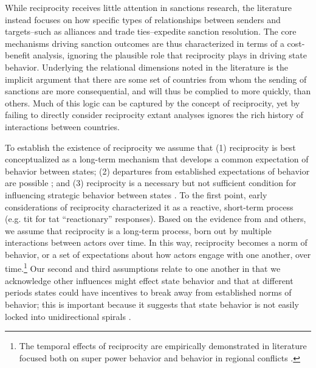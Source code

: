 While reciprocity receives little attention in sanctions research, the literature instead focuses on how specific types of relationships between senders and targets--such as alliances and trade ties--expedite sanction resolution. The core mechanisms driving sanction outcomes are thus characterized in terms of a cost-benefit analysis, ignoring the plausible role that reciprocity plays in driving state behavior. Underlying the relational dimensions noted in the literature is the implicit argument that there are some set of countries from whom the sending of sanctions are more consequential, and will thus be complied to more quickly, than others. Much of this logic can be captured by the concept of reciprocity, yet by failing to directly consider reciprocity extant analyses ignores the rich history of interactions between countries. 

To establish the existence of reciprocity we assume that (1) reciprocity is best conceptualized as a long-term mechanism that develops a common expectation of behavior between states; (2) departures from established expectations of behavior are possible \citep{moore1995}; and (3) reciprocity is a necessary but not sufficient condition for influencing strategic behavior between states \citep{goldstein2001}. To the first point, early considerations of reciprocity characterized it as a reactive, short-term process (e.g. tit for tat ``reactionary'' responses). Based on the evidence from \citet{rajmaira:1990} and others, we assume that reciprocity is a long-term process, born out by multiple interactions between actors over time. In this way, reciprocity becomes a norm of behavior, or a set of expectations about how actors engage with one another, over time.\footnote{The temporal effects of reciprocity are empirically demonstrated in literature focused both on super power behavior \citep{rajmaira:1990} and behavior in regional conflicts \cite{goldstein1997}.} Our second and third assumptions relate to one another in that we acknowledge other influences might effect state behavior and that at different periods states could have incentives to break away from established norms of behavior; this is important because it suggests that state behavior is not easily locked into unidirectional spirals \citep{moore1995}.

